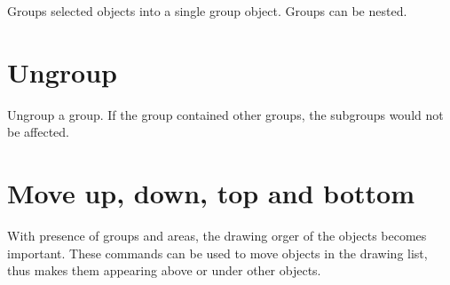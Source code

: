 Groups selected objects into a single group object. Groups can be nested.

\section{Ungroup}\label{sec:ungroup}

Ungroup a group. If the group contained other groups, the subgroups would not be affected.

\section{Move up, down, top and bottom}\label{sec:moveupdown}

With presence of groups and areas, the drawing orger of the objects becomes important.
These commands can be used to move objects in the drawing list, thus makes them
appearing above or under other objects.
